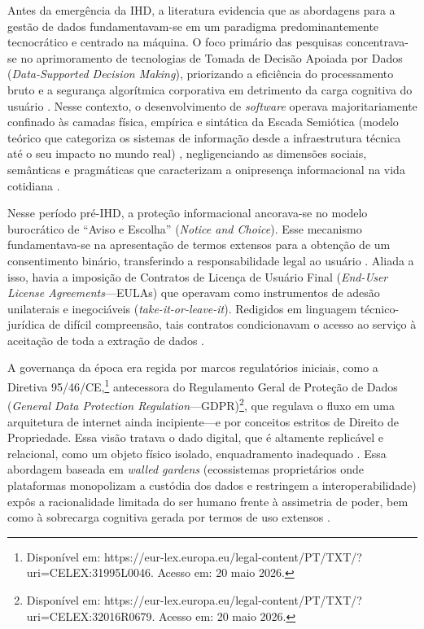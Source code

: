 \documentclass[12pt]{article}
\begin{document}
    Antes da emergência da IHD, a literatura evidencia que as abordagens para a gestão de dados fundamentavam-se em um paradigma predominantemente tecnocrático e centrado na máquina. O foco primário das pesquisas concentrava-se no aprimoramento de tecnologias de Tomada de Decisão Apoiada por Dados (\textit{Data-Supported Decision Making}), priorizando a eficiência do processamento bruto e a segurança algorítmica corporativa em detrimento da carga cognitiva do usuário \cite{calvetti2024human, Locoro2020}. Nesse contexto, o desenvolvimento de \textit{software} operava majoritariamente confinado às camadas física, empírica e sintática da Escada Semiótica (modelo teórico que categoriza os sistemas de informação desde a infraestrutura técnica até o seu impacto no mundo real) \cite{Hornung2015}, negligenciando as dimensões sociais, semânticas e pragmáticas que caracterizam a onipresença informacional na vida cotidiana \cite{Strey2019Human}.

    Nesse período pré-IHD, a proteção informacional ancorava-se no modelo burocrático de ``Aviso e Escolha'' (\textit{Notice and Choice}). Esse mecanismo fundamentava-se na apresentação de termos extensos para a obtenção de um consentimento binário, transferindo a responsabilidade legal ao usuário \cite{Jones2017}. Aliada a isso, havia a imposição de Contratos de Licença de Usuário Final (\textit{End-User License Agreements}---EULAs) que operavam como instrumentos de adesão unilaterais e inegociáveis (\textit{take-it-or-leave-it}). Redigidos em linguagem técnico-jurídica de difícil compreensão, tais contratos condicionavam o acesso ao serviço à aceitação de toda a extração de dados \cite{Hutton2017}.

    A governança da época era regida por marcos regulatórios iniciais, como a Diretiva 95/46/CE,\footnote{Disponível em: https://eur-lex.europa.eu/legal-content/PT/TXT/?uri=CELEX:31995L0046. Acesso em: 20 maio 2026.} antecessora do Regulamento Geral de Proteção de Dados (\textit{General Data Protection Regulation}---GDPR)\footnote{Disponível em: https://eur-lex.europa.eu/legal-content/PT/TXT/?uri=CELEX:32016R0679. Acesso em: 20 maio 2026.}, que regulava o fluxo em uma arquitetura de internet ainda incipiente---e por conceitos estritos de Direito de Propriedade. Essa visão tratava o dado digital, que é altamente replicável e relacional, como um objeto físico isolado, enquadramento inadequado \cite{malgieri2019automated, janecek2018ownership}. Essa abordagem baseada em \textit{walled gardens} (ecossistemas proprietários onde plataformas monopolizam a custódia dos dados e restringem a interoperabilidade) \cite{janecek2018ownership} expôs a racionalidade limitada do ser humano frente à assimetria de poder, bem como à sobrecarga cognitiva gerada por termos de uso extensos \cite{malgieri2020vulnerable, DOWTHWAITE2024, chalhoub2024useful}.
    
\end{document}
